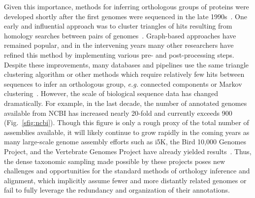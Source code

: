 Given this importance, methods for inferring orthologous groups of proteins were developed shortly after the first genomes were sequenced in the late 1990s~\cite{Fleischmann1995, Goffeau1996, CESC1998}. One early and influential approach was to cluster triangles of hits resulting from homology searches between pairs of genomes~\cite{Tatusov1997}. Graph-based approaches have remained popular, and in the intervening years many other researchers have refined this method by implementing various pre- and post-processing steps. Despite these improvements, many databases and pipelines use the same triangle clustering algorithm or other methods which require relatively few hits between sequences to infer an orthologous group, \textit{e.g.} connected components or Markov clustering~\cite{Remm2001, Enright2002, Li2003, Jensen2007, Linard2011, Emms2015, Train2017, Cosentino2018}. However, the scale of biological sequence data has changed dramatically. For example, in the last decade, the number of annotated genomes available from NCBI has increased nearly 20-fold and currently exceeds 900 (Fig.~\ref{sfig:ncbi}). Though this figure is only a rough proxy of the total number of assemblies available, it will likely continue to grow rapidly in the coming years as many large-scale genome assembly efforts such as i5K, the Bird 10,000 Genomes Project, and the Vertebrate Genomes Project have already yielded results~\cite{Thomas2020, Feng2020, Rhie2021}. Thus, the dense taxonomic sampling made possible by these projects poses new challenges and opportunities for the standard methods of orthology inference and alignment, which implicitly assume fewer and more distantly related genomes or fail to fully leverage the redundancy and organization of their annotations.

